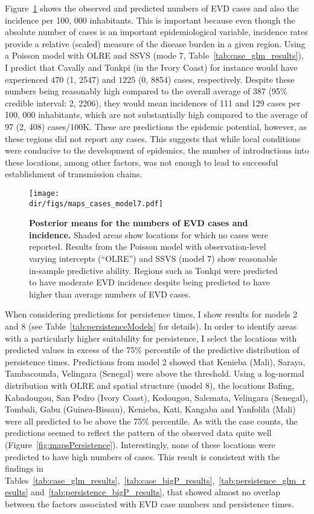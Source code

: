 Figure~\ref{fig:mapsCases} shows the observed and predicted numbers of EVD cases and also the incidence per 100, 000 inhabitants.
This is important because even though the absolute number of cases is an important epidemiological variable, incidence rates provide a relative (scaled) measure of the disease burden in a given region.
Using a Poisson model with OLRE and SSVS (mode 7, Table~\ref{tab:case_glm_results}), I predict that Cavally and Tonkpi (in the Ivory Coast) for instance would have experienced $470$ (1, 2547) and $1225$ (0, 8854) cases, respectively.
Despite these numbers being reasonably high compared to the overall average of 387 (95\% credible interval: 2, 2206), they would mean incidences of 111 and 129 cases per 100, 000 inhabitants, which are not substantially high compared to the average of 97 (2, 408) cases/100K.
These are predictions the epidemic potential, however, as these regions did not report any cases.
This suggests that while local conditions were conducive to the development of epidemics, the number of introductions into these locations, among other factors, was not enough to lead to successful establishment of transmission chains. 

\begin{figure}[htbp]
  \centering
  \texttt{[image: \\dir/figs/maps\_cases\_model7.pdf]}
  \caption[Case counts predictions]{\textbf{Posterior means for the numbers of EVD cases and incidence.}
  Shaded areas show locations for which no cases were reported.
  Results from the Poisson model with observation-level varying intercepts (``OLRE'') and SSVS (model 7) show reasonable in-sample predictive ability.
  Regions such as Tonkpi were predicted to have moderate EVD incidence despite being predicted to have higher than average numbers of EVD cases.
  }
  \label{fig:mapsCases}
\end{figure}

When considering predictions for persistence times, I show results for models 2 and 8 (see Table~\ref{tab:persistenceModels} for details).
In order to identify areas with a particularly higher suitability for persistence, I select the locations with predicted values in excess of the 75\% percentile of the predictive distribution of persistence times.
Predictions from model 2 showed that Kenieba (Mali), Saraya, Tambacounda, Velingara (Senegal) were above the threshold.
Using a log-normal distribution with OLRE and spatial structure (model 8), the locations Bafing, Kabadougou, San Pedro (Ivory Coast), Kedougou, Salemata, Velingara (Senegal), Tombali, Gabu (Guinea-Bissau), Kenieba, Kati, Kangaba and Yanfolila (Mali) were all predicted to be above the 75\% percentile.
As with the case counts, the predictions seemed to reflect the pattern of the observed data quite well (Figure~\ref{fig:mapsPersistence}).
Interestingly, none of these locations were predicted to have high numbers of cases.
This result is consistent with the findings in Tables~\ref{tab:case_glm_results},~\ref{tab:case_bigP_results},~\ref{tab:persistence_glm_results} and~\ref{tab:persistence_bigP_results}, that showed almost no overlap between the factors associated with EVD case numbers and persistence times.

